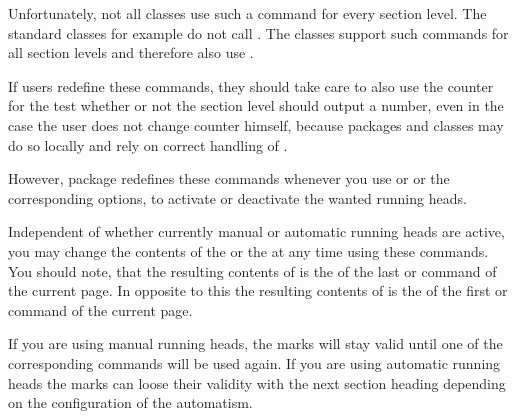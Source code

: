   Unfortunately, not all classes use such a command for
  every section level. The standard classes for example do not call
  . The \KOMAScript{} classes support such commands for all
  section levels and therefore also use .

  If users redefine these commands, they should take care
  to also use the counter  for the test
  whether or not the section level should output a number, even in the case
  the user does not change counter 
  himself, because packages and classes may do so locally and rely on correct
  handling of .

  However, package  redefines these commands whenever you
  use  or  or
  the corresponding options, to activate or deactivate the wanted running
  heads.%
  \EndIndexGroup


  \begin{Declaration}
  \end{Declaration}
  Independent of whether currently manual or automatic running heads are
  active, you may change the contents of the  or the
   at any time using these commands. You should note, that
  the resulting contents of  is the
   of the last  or  command
  of the current page. In opposite to this the resulting contents of
   is the  of the first
   or  command of the current page.

  If you are using manual running heads, the marks will stay valid until one
  of the corresponding commands will be used again. If you are using automatic
  running heads the marks can loose their validity with the next section
  heading depending on the configuration of the automatism.

